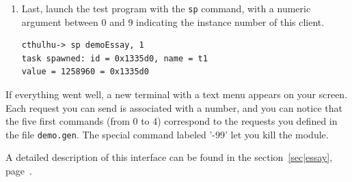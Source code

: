 \begin{enumerate}
\item Last, launch the test program with the {\tt sp} command, with a
numeric argument between 0 and 9 indicating the instance number of this
client. 

\begin{center}\begin{cartouche}\small\begin{verbatim}
cthulhu-> sp demoEssay, 1
task spawned: id = 0x1335d0, name = t1
value = 1258960 = 0x1335d0
\end{verbatim}\end{cartouche}\end{center}

\end{enumerate}

If everything went well, a new terminal with a text  menu appears on your
screen.  Each request you  can send is associated  with a number, and you
can notice that the five  first commands (from  0 to 4) correspond to the
requests you defined  in  the file  {\tt  demo.gen}. The special  command
labeled '-99' let you kill the module.

A  detailed   description   of this interface   can    be  found   in the
section~\ref{sec|essay}, page~\pageref{sec|essay}.